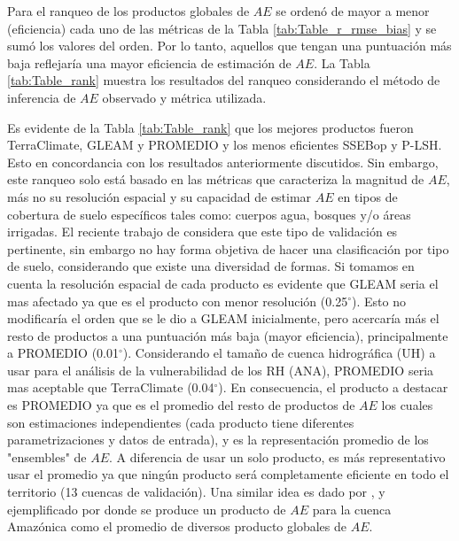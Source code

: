 \documentclass[12pt]{article}
\begin{document}


Para el ranqueo de los productos globales de $AE$ se ordenó de mayor a menor (eficiencia) cada uno de las métricas de la Tabla \ref{tab:Table_r_rmse_bias} y se sumó los valores del orden. Por lo tanto, aquellos que tengan una puntuación más baja reflejaría una mayor eficiencia de estimación de $AE$. La Tabla \ref{tab:Table_rank} muestra los resultados del ranqueo considerando el método de inferencia de $AE$ observado y métrica utilizada. 



\thispagestyle{empty}

Es evidente de la Tabla \ref{tab:Table_rank} que los mejores productos fueron TerraClimate, GLEAM y PROMEDIO y los menos eficientes SSEBop y P-LSH. Esto en concordancia con los resultados anteriormente discutidos. Sin embargo, este ranqueo solo está basado en las métricas que caracteriza la magnitud de $AE$, más no su resolución espacial y su capacidad de estimar $AE$ en tipos de cobertura de suelo específicos tales como: cuerpos agua, bosques y/o áreas irrigadas. El reciente trabajo de \citet{Weerasinghe2019discuss} considera que este tipo de validación es pertinente, sin embargo no hay forma objetiva de hacer una clasificación por tipo de suelo, considerando que existe una diversidad de formas. Si tomamos en cuenta la resolución espacial de cada producto es evidente que GLEAM seria el mas afectado ya que es el producto con menor resolución (0.25$^{\circ}$). Esto no modificaría el orden que se le dio a GLEAM inicialmente, pero acercaría más el resto de productos a una puntuación más baja (mayor eficiencia), principalmente a PROMEDIO (0.01$^{\circ}$). Considerando el tamaño de cuenca hidrográfica (UH) a usar para el análisis de la vulnerabilidad de los RH (ANA), PROMEDIO seria mas aceptable que TerraClimate (0.04$^{\circ}$). En consecuencia, el producto a destacar es PROMEDIO ya que es el promedio del resto de productos de $AE$ los cuales son estimaciones independientes (cada producto tiene diferentes parametrizaciones y datos de entrada), y es la representación promedio de los "ensembles" de $AE$. A diferencia de usar un solo producto, es más representativo usar el promedio ya que ningún producto será completamente eficiente en todo el territorio (13 cuencas de validación). Una similar idea es dado por \citet{zhang2016review}, y ejemplificado por \citet{da2019spatial} donde se produce un producto de $AE$ para la cuenca Amazónica como el promedio de diversos producto globales de $AE$.
\end{document}
